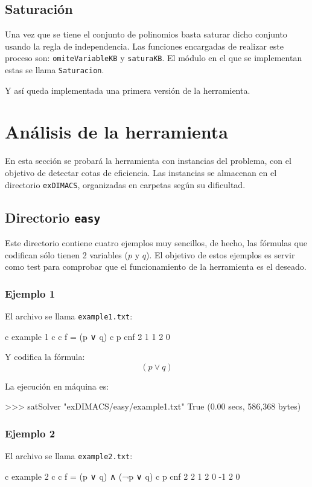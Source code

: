 \subsection{Saturación}

Una vez que se tiene el conjunto de polinomios basta saturar dicho conjunto usando la regla de independencia. Las funciones encargadas de realizar este proceso son: \texttt{omiteVariableKB} y \texttt{saturaKB}. El módulo en el que se implementan estas se llama \texttt{Saturacion}.


Y así queda implementada una primera versión de la herramienta.

\newpage
\section{Análisis de la herramienta}

En esta sección se probará la herramienta con instancias del problema, con el objetivo de detectar cotas de eficiencia. Las instancias se almacenan en el directorio \texttt{exDIMACS}, organizadas en carpetas según su dificultad.

\subsection{Directorio \texttt{easy}}
Este directorio contiene cuatro ejemplos muy sencillos, de hecho, las fórmulas que codifican sólo  tienen 2 variables ($p$ y $q$). El objetivo de estos ejemplos es servir como test para comprobar que el funcionamiento de la herramienta es el deseado.

\subsubsection{Ejemplo 1}

El archivo se llama \texttt{example1.txt}:
\begin{codigo}
c example 1 
c 
c f = (p ∨ q)
c
p cnf 2 1 
1 2 0
\end{codigo}

Y codifica la fórmula:
$$(p \vee q)$$

La ejecución en máquina es:
\begin{code}
>>> satSolver "exDIMACS/easy/example1.txt"
True
(0.00 secs, 586,368 bytes)
\end{code}
\subsubsection{Ejemplo 2}
El archivo se llama \texttt{example2.txt}:
\begin{codigo}
c example 2
c 
c f = (p ∨ q) ∧ (¬p ∨ q)
c
p cnf 2 2
1 2 0
-1 2 0
\end{codigo}

